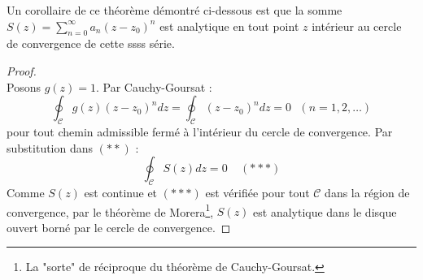 Un corollaire de ce théorème démontré ci-dessous est que la somme $S(z) = \sum_{n=0}^\infty 
a_n (z-z_0)^n$ est analytique en tout point $z$ intérieur au cercle de convergence de cette ssss
série.
	
\begin{proof}\ \\
	Posons $g(z) = 1$. Par Cauchy-Goursat :
	\begin{equation}
		\oint_\mathcal{C}g(z)(z-z_0)^n dz = \oint_\mathcal{C}(z-z_0)^n dz = 0\ \ \ (n=1,2,\dots)
	\end{equation}
	pour tout chemin admissible fermé à l'intérieur du cercle de convergence. Par substitution 
	dans $(**)$ :
	\begin{equation}
		\oint_\mathcal{C} S(z)dz = 0\ \ \ \ \ (***)
	\end{equation}
	Comme $S(z)$ est continue et $(***)$ est vérifiée pour tout $\mathcal{C}$ dans la région 
	de convergence, par le théorème de Morera\footnote{La "sorte" de réciproque du théorème 
	de Cauchy-Goursat.}, $S(z)$ est analytique dans le disque ouvert borné par le cercle de 
	convergence.
\end{proof}
	
	
	
